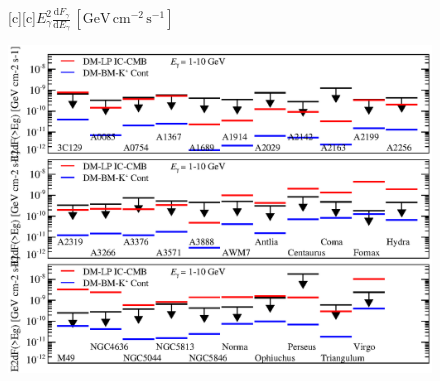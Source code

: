 \documentclass[dvips]{article}
\begin{document}
\pagestyle{empty}

\newcommand{\size}{\scriptsize}%

\begin{figure}
  [c][c]{\size $E_\gamma^2\frac{\displaystyle\mathrm{d}F_\gamma}{\displaystyle\mathrm{d}E_\gamma}\,[\mathrm{GeV}\,\mathrm{cm}^{-2}\,\mathrm{s}^{-1}]$}
  
    \includegraphics[width=\textwidth]{Fermi.comp.DM_raw.eps}
\end{figure}
\end{document}
